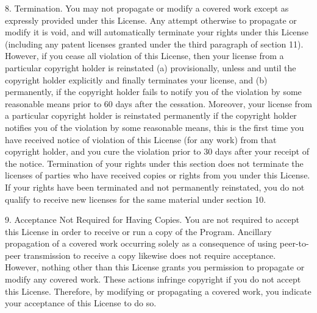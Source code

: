 \documentclass {scrbook}
\begin{document}
\begin{tiny}
8. Termination. You may not propagate or modify a covered work except as expressly provided under this License. Any attempt otherwise to propagate or modify it is void, and will automatically terminate your rights under this License (including any patent licenses granted under the third paragraph of section 11). However, if you cease all violation of this License, then your license from a particular copyright holder is reinstated (a) provisionally, unless and until the copyright holder explicitly and finally terminates your license, and (b) permanently, if the copyright holder fails to notify you of the violation by some reasonable means prior to 60 days after the cessation. Moreover, your license from a particular copyright holder is reinstated permanently if the copyright holder notifies you of the violation by some reasonable means, this is the first time you have received notice of violation of this License (for any work) from that copyright holder, and you cure the violation prior to 30 days after your receipt of the notice. Termination of your rights under this section does not terminate the licenses of parties who have received copies or rights from you under this License. If your rights have been terminated and not permanently reinstated, you do not qualify to receive new licenses for the same material under section 10.

9. Acceptance Not Required for Having Copies. You are not required to accept this License in order to receive or run a copy of the Program. Ancillary propagation of a covered work occurring solely as a consequence of using peer-to-peer transmission to receive a copy likewise does not require acceptance. However, nothing other than this License grants you permission to propagate or modify any covered work. These actions infringe copyright if you do not accept this License. Therefore, by modifying or propagating a covered work, you indicate your acceptance of this License to do so.


\end{tiny}
\end{document}
